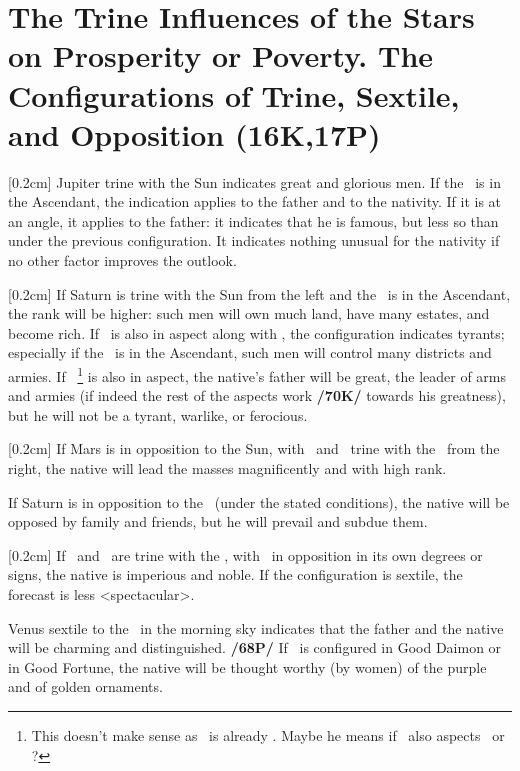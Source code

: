 \section{The Trine Influences of the Stars on Prosperity or Poverty. The Configurations of Trine, Sextile, and Opposition (16K,17P)}
\marginnote{\Jupiter \Trine \Sun}[0.2cm]
Jupiter trine with the Sun indicates great and glorious men. If the \Sun\, is in the Ascendant, the
indication applies to the father and to the nativity. If it is at an angle, it applies to the father: it indicates that he is famous, but less so than under the previous configuration. It indicates nothing unusual for the nativity if no other factor improves the outlook. 

\marginnote{\Saturn \Trine \Sun}[0.2cm]
If Saturn is trine with the Sun from the left and the \Sun\, is in the Ascendant, the rank will be higher: such men will own much land, have many estates, and become rich. If \Mars\, is also in aspect along with \Jupiter, the configuration indicates tyrants; especially if the \Sun\, is in the Ascendant, such men will control many districts and armies. If \Saturn\, \footnote{This doesn't make sense as \Saturn\, is already \Trine\Sun. Maybe he means if \Saturn\, also aspects \Mars\, or \Jupiter?}
is also in aspect, the native’s father will be great, the leader of arms and armies (if indeed the rest of the aspects work \textbf{/70K/} towards his greatness), but he will not be a tyrant, warlike, or ferocious. 

\marginnote{\Mars \Opposition \Sun}[0.2cm]
If Mars is in opposition to the Sun, with \Jupiter\, and \Saturn\, trine with the \Sun\, from the right, the native will lead the masses magnificently and with high rank. 

If Saturn is in opposition to the \Sun\, (under the stated conditions), the native will be opposed by family and friends, but he will prevail and subdue
them. 

\marginnote{\Saturn\, \Mars \Trine \Sun}[0.2cm]
If \Saturn\, and \Mars\, are trine with the \Sun, with \Jupiter\, in opposition in its own degrees or signs, the native is imperious and noble. If the configuration is sextile, the forecast is less <spectacular>.

Venus \marginnote{\Venus \Sextile \Sun} sextile to the \Sun\, in the morning sky indicates that the father and the native will be charming and distinguished. \textbf{/68P/} If \Venus\, is configured in Good Daimon or in Good Fortune, the native will be thought worthy (by women) of the purple and of golden ornaments.

